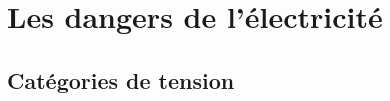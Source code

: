 

\begin{comment}

\documentclass[a4paper, 11pt, twoside, fleqn]{memoir}

\usepackage{AOCDTF}

\marqueurchapitre


	\openleft %

\end{comment}

\chapter{Les dangers de l'électricité}
\label{chap:dangers_electricite}
\ChapFrame %

\section{Catégories de tension}

